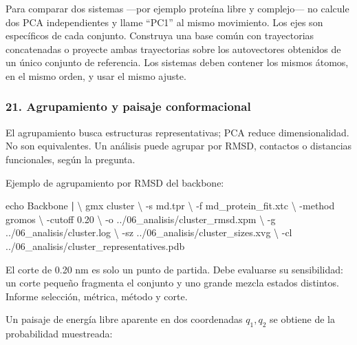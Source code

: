 \documentclass[
  spanish,
  11pt,
  a4paper]{article}
\newenvironment{Shaded}{\begin{snugshade}}{\end{snugshade}}
\newcommand{\AttributeTok}[1]{\textcolor[rgb]{0.13,0.29,0.53}{#1}}
\newcommand{\BuiltInTok}[1]{#1}
\newcommand{\DataTypeTok}[1]{\textcolor[rgb]{0.13,0.29,0.53}{#1}}
\newcommand{\ExtensionTok}[1]{#1}
\newcommand{\KeywordTok}[1]{\textcolor[rgb]{0.13,0.29,0.53}{\textbf{#1}}}
\newcommand{\NormalTok}[1]{#1}
\begin{document}
Para comparar dos sistemas ---por ejemplo proteína libre y complejo---
no calcule dos PCA independientes y llame ``PC1'' al mismo movimiento.
Los ejes son específicos de cada conjunto. Construya una base común con
trayectorias concatenadas o proyecte ambas trayectorias sobre los
autovectores obtenidos de un único conjunto de referencia. Los sistemas
deben contener los mismos átomos, en el mismo orden, y usar el mismo
ajuste.

\subsubsection{21. Agrupamiento y paisaje
conformacional}\label{agrupamiento-y-paisaje-conformacional}

El agrupamiento busca estructuras representativas; PCA reduce
dimensionalidad. No son equivalentes. Un análisis puede agrupar por
RMSD, contactos o distancias funcionales, según la pregunta.

Ejemplo de agrupamiento por RMSD del backbone:

\begin{Shaded}
\begin{Highlighting}[]
\BuiltInTok{echo}\NormalTok{ Backbone }\KeywordTok{|} \DataTypeTok{\textbackslash{}}
\ExtensionTok{gmx}\NormalTok{ cluster }\DataTypeTok{\textbackslash{}}
    \AttributeTok{{-}s}\NormalTok{ md.tpr }\DataTypeTok{\textbackslash{}}
    \AttributeTok{{-}f}\NormalTok{ md\_protein\_fit.xtc }\DataTypeTok{\textbackslash{}}
    \AttributeTok{{-}method}\NormalTok{ gromos }\DataTypeTok{\textbackslash{}}
    \AttributeTok{{-}cutoff}\NormalTok{ 0.20 }\DataTypeTok{\textbackslash{}}
    \AttributeTok{{-}o}\NormalTok{ ../06\_analisis/cluster\_rmsd.xpm }\DataTypeTok{\textbackslash{}}
    \AttributeTok{{-}g}\NormalTok{ ../06\_analisis/cluster.log }\DataTypeTok{\textbackslash{}}
    \AttributeTok{{-}sz}\NormalTok{ ../06\_analisis/cluster\_sizes.xvg }\DataTypeTok{\textbackslash{}}
    \AttributeTok{{-}cl}\NormalTok{ ../06\_analisis/cluster\_representatives.pdb}
\end{Highlighting}
\end{Shaded}

El corte de 0.20 nm es solo un punto de partida. Debe evaluarse su
sensibilidad: un corte pequeño fragmenta el conjunto y uno grande mezcla
estados distintos. Informe selección, métrica, método y corte.

Un paisaje de energía libre aparente en dos coordenadas \(q_1,q_2\) se
obtiene de la probabilidad muestreada:
\end{document}
